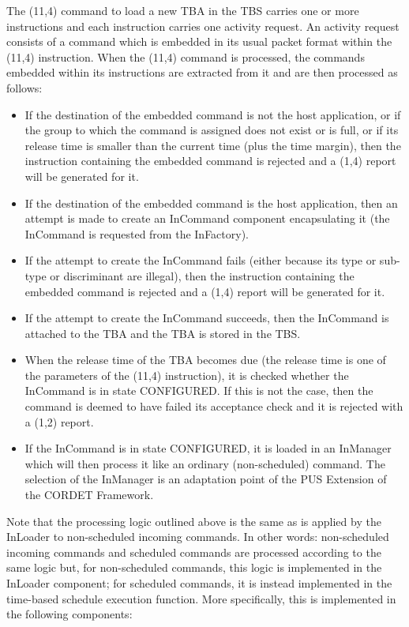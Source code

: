 \documentclass{pnp_article}
\begin{document}
The (11,4) command to load a new TBA in the TBS carries one or more instructions and each instruction carries one activity request. An activity request consists of a command which is embedded in its usual packet format within the (11,4) instruction. When the (11,4) command is processed, the commands embedded within its instructions are extracted from it and are then processed as follows:

\begin{itemize}
\item If the destination of the embedded command is not the host application, or if the group to which the command is assigned does not exist or is full, or if its release time is smaller than the current time (plus the time margin), then the instruction containing the embedded command is rejected and a (1,4) report will be generated for it.
\item If the destination of the embedded command is the host application, then an attempt is made to create an InCommand component encapsulating it (the InCommand is requested from the InFactory).
\item If the attempt to create the InCommand fails (either because its type or sub-type or discriminant are illegal), then the instruction containing the embedded command is rejected and a (1,4) report will be generated for it.
\item If the attempt to create the InCommand succeeds, then the InCommand is attached to the TBA and the TBA is stored in the TBS.
\item When the release time of the TBA becomes due (the release time is one of the parameters of the (11,4) instruction), it is checked whether the InCommand is in state CONFIGURED. If this is not the case, then the command is deemed to have failed its acceptance check and it is rejected with a (1,2) report.
\item If the InCommand is in state CONFIGURED, it is loaded in an InManager which will then process it like an ordinary (non-scheduled) command. The selection of the InManager is an adaptation point of the PUS Extension of the CORDET Framework.
\end{itemize}

Note that the processing logic outlined above is the same as is applied by the InLoader to non-scheduled incoming commands. In other words: non-scheduled incoming commands and scheduled commands are processed according to the same logic but, for non-scheduled commands, this logic is implemented in the InLoader component; for scheduled commands, it is instead implemented in the time-based schedule execution function. More specifically, this is implemented in the following components:
\end{document}
